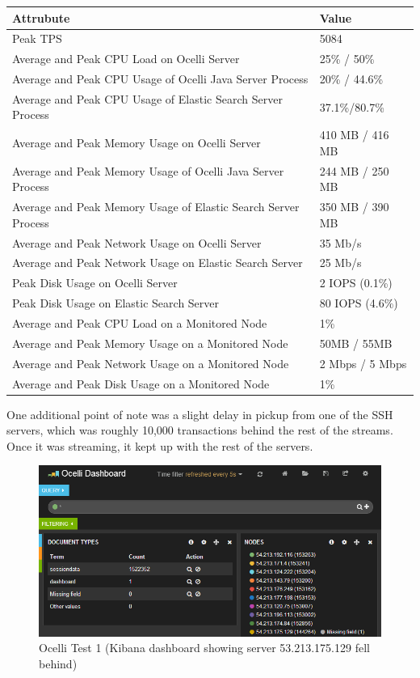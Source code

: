 \documentclass{llncs}
\begin{document}
\begin{flushleft}
    \begin{tabular}{ | l | l |}
    \hline
  Attrubute & Value  \\ \hline
  Peak TPS & 5084  \\ \hline
  Average and Peak CPU Load on Ocelli Server & 25\% / 50\%  \\ \hline
  Average and Peak CPU Usage of Ocelli Java Server Process & 20\% / 44.6\% \\ \hline
 Average and Peak CPU Usage of Elastic Search Server Process & 37.1\%/80.7\%	  \\ \hline
  Average and Peak Memory Usage on Ocelli Server & 410 MB / 416 MB	 \\ \hline
  Average and Peak Memory Usage of Ocelli Java Server Process &	244 MB / 250 MB		 \\ \hline
 Average and Peak Memory Usage of Elastic Search Server Process &	350 MB / 390 MB		 \\ \hline
Average and Peak Network Usage on Ocelli Server &	35 Mb/s 	 \\ \hline
Average and Peak Network Usage on Elastic Search Server & 25 Mb/s 	 \\ \hline
Peak Disk Usage on Ocelli Server &	2 IOPS (0.1\%)		 \\ \hline
Peak Disk Usage on Elastic Search Server &	80 IOPS (4.6\%)		 \\ \hline
Average and Peak CPU Load on a Monitored Node& 	1\% 	 \\ \hline
  Average and Peak Memory Usage on a Monitored Node &	50MB / 55MB	 \\ \hline
Average and Peak Network Usage on a Monitored Node &	2 Mbps / 5 Mbps		 \\ \hline
  Average and Peak Disk Usage on a Monitored Node &  1\%	\\ 
    \hline
    \end{tabular}
\end{flushleft}

One additional point of note was a slight delay in pickup from one of the SSH servers, which was roughly 10,000 transactions behind the rest of the streams. Once it was streaming, it kept up with the rest of the servers.

\begin{figure}[h]
    \centering
    \includegraphics[scale=0.7]{app7}
    \caption{Ocelli Test 1 (Kibana dashboard showing server 53.213.175.129 fell behind)}
    \label{fig:ocelli_dm}
\end{figure}
\end{document}
